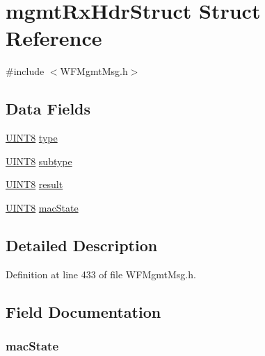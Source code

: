 \hypertarget{structmgmt_rx_hdr_struct}{}\section{mgmt\+Rx\+Hdr\+Struct Struct Reference}
\label{structmgmt_rx_hdr_struct}


{\ttfamily \#include $<$W\+F\+Mgmt\+Msg.\+h$>$}

\subsection*{Data Fields}
\begin{DoxyCompactItemize}
\item 
\hyperlink{_generic_type_defs_8h_ab27e9918b538ce9d8ca692479b375b6a}{U\+I\+N\+T8} \hyperlink{structmgmt_rx_hdr_struct_a631bceb766461ab7475c7ed56717aac8}{type}
\item 
\hyperlink{_generic_type_defs_8h_ab27e9918b538ce9d8ca692479b375b6a}{U\+I\+N\+T8} \hyperlink{structmgmt_rx_hdr_struct_ac6f7a21e76e96bc4dde6e4813e64d00d}{subtype}
\item 
\hyperlink{_generic_type_defs_8h_ab27e9918b538ce9d8ca692479b375b6a}{U\+I\+N\+T8} \hyperlink{structmgmt_rx_hdr_struct_a77ca38f5799927d72f2b120713cd04f1}{result}
\item 
\hyperlink{_generic_type_defs_8h_ab27e9918b538ce9d8ca692479b375b6a}{U\+I\+N\+T8} \hyperlink{structmgmt_rx_hdr_struct_ad2d969bad658307ebabb803bb5d83650}{mac\+State}
\end{DoxyCompactItemize}


\subsection{Detailed Description}


Definition at line 433 of file W\+F\+Mgmt\+Msg.\+h.



\subsection{Field Documentation}
\hypertarget{structmgmt_rx_hdr_struct_ad2d969bad658307ebabb803bb5d83650}{}
\subsubsection[{mac\+State}]{ mac\+State}\label{structmgmt_rx_hdr_struct_ad2d969bad658307ebabb803bb5d83650}



